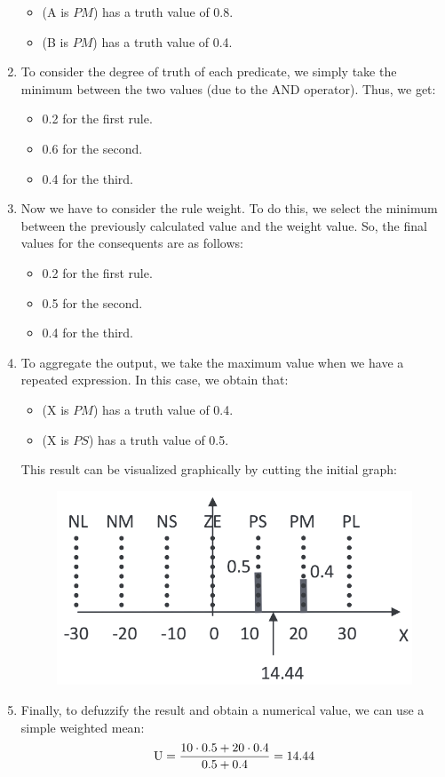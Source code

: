 \begin{example}
\begin{enumerate}
\begin{itemize}
                \item (A is $PM$) has a truth value of 0.8.
                \item (B is $PM$) has a truth value of 0.4.
            \end{itemize}
        \item To consider the degree of truth of each predicate, we simply take the minimum between the two values (due to the AND operator). 
            Thus, we get: 
            \begin{itemize}
                \item 0.2 for the first rule. 
                \item 0.6 for the second. 
                \item 0.4 for the third.
            \end{itemize}
        \item Now we have to consider the rule weight. 
            To do this, we select the minimum between the previously calculated value and the weight value. 
            So, the final values for the consequents are as follows:
            \begin{itemize}
                \item 0.2 for the first rule. 
                \item 0.5 for the second. 
                \item 0.4 for the third.
            \end{itemize}
        \item To aggregate the output, we take the maximum value when we have a repeated expression. 
            In this case, we obtain that: 
            \begin{itemize}
                \item (X is $PM$) has a truth value of 0.4.
                \item (X is $PS$) has a truth value of 0.5.
            \end{itemize}
            This result can be visualized graphically by cutting the initial graph: 
            \begin{figure}[H]
                \centering
                \includegraphics[width=0.4\linewidth]{images/cut.png}
            \end{figure}
        \item Finally, to defuzzify the result and obtain a numerical value, we can use a simple weighted mean:
            \[\textnormal{U}=\dfrac{10 \cdot 0.5 + 20 \cdot 0.4}{0.5+0.4}=14.44\]
    \end{enumerate}
\end{example}
